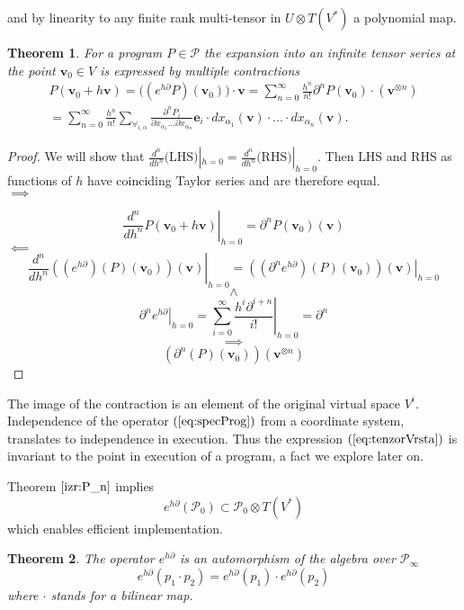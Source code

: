 \documentclass{article}
\newcommand{\e}{\mathbf{e}}
\newcommand{\vv}{\mathbf{v}}
\newcommand{\dP}{\mathcal{P}}
\newcommand{\D}{\partial}
\newtheorem{izrek}{Theorem}[section]
\begin{document}
and by linearity to any finite rank multi-tensor in $U\otimes T(V^*)$ a
polynomial map.
 
\begin{izrek}\label{izr:e^d}
	For a program $P\in\dP$  the expansion into an infinite tensor series
  at the point $\vv_0\in V$ is expressed by multiple contractions 
	\begin{multline}\label{eq:tenzorVrsta}
	P(\vv_0+h\vv) = \Big((e^{h\D}P)(\vv_0)\Big)\cdot\vv
  = \sum_{n=0}^\infty\frac{h^n}{n!}\D^nP(\vv_0)\cdot (\vv^{\otimes n})\\
  = \sum_{n=0}^\infty \frac{h^n}{n!}\sum_{\forall_{i,\alpha}}\frac{\partial^nP_i}{\partial
 		    x_{\alpha_1}\ldots \partial x_{\alpha_n}}\e_i\cdot
 		  dx_{\alpha_1}(\vv)\cdot\ldots \cdot dx_{\alpha_n}(\vv).
	\end{multline}
\end{izrek}
 
 \begin{proof}
We will show that $\frac{d^n}{dh^n}\text{(LHS)}|_{h=0}=\frac{d^n}{dh^n}\text{(RHS)}|_{h=0}$. Then $\text{LHS}$ and $\text{RHS}$ as functions
of $h$ have coinciding Taylor series and are therefore equal.\\
 $\implies$
 
 $$\left. \frac{d^n}{dh^n}P(\vv_0+h\vv)\right|_{h=0}=\D^n P(\vv_0)(\vv)$$
 $\impliedby$
 $$\left. \frac{d^n}{dh^n}\left((e^{h\D})(P)(\vv_0)\right)(\vv)\right|_{h=0}=
\left. \left((\D^n e^{h\D})(P)(\vv_0)\right)(\vv)\right|_{h=0}$$
 $$\land$$
 $$\left. \D^ne^{h\D}\right| _{h=0}=\left. \sum\limits_{i=0}^{\infty}\frac{h^i\D^{i+n}}{i!}\right|_{h=0}=\D^n$$
 $$\implies$$
 $$\left(\D^n(P)(\vv_0)\right)(\vv^{\otimes n})$$
 \end{proof}
 
 The image of the contraction is an element of the original virtual space $V^i$. Independence of the operator $(\ref{eq:specProg})$ from a coordinate system, translates to independence in execution. Thus the expression $(\ref{eq:tenzorVrsta})$ is invariant to the point in execution of a program, a fact we explore later on.  
 
 Theorem $\ref{izr:P_n}$ implies
     \begin{equation}
     	e^{h\D}(\dP_0)\subset\dP_0\otimes T(V^*)
     \end{equation}      
which enables efficient implementation.
 
 \begin{izrek}\label{izr:prod}
 The operator $e^{h\D}$ is an automorphism of the algebra over $\dP_\infty$
 \begin{equation}
 	e^{h\D}(p_1\cdot p_2)=e^{h\D}(p_1)\cdot e^{h\D}(p_2)
 \end{equation}
 where $\cdot$ stands for a bilinear map.
 \end{izrek}
 
\end{document}
